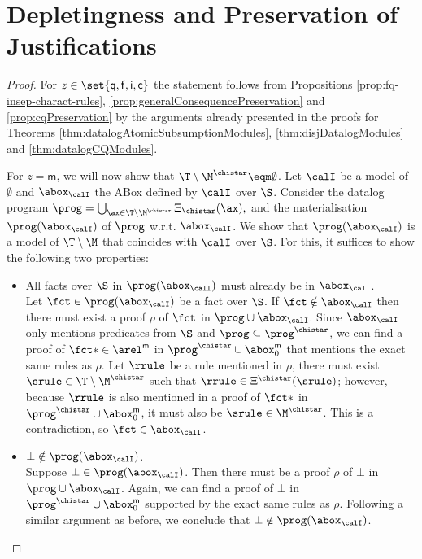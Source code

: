 \section{Depletingness and Preservation of Justifications}

\depletingness*
\begin{proof}
For $z\in\set{\mathsf{q},\mathsf{f},\mathsf{i},\mathsf{c}}$
the statement follows from Propositions \ref{prop:fq-insep-charact-rules}, 
\ref{prop:generalConsequencePreservation} and 
\ref{prop:cqPreservation} by the arguments already presented in the proofs for 
Theorems \ref{thm:datalogAtomicSubsumptionModules}, 
\ref{thm:disjDatalogModules} and \ref{thm:datalogCQModules}.

For $z=\mathsf{m}$, we will now show that $\T\setminus \M^{\chistar} \eqm \emptyset$.
Let $\calI$ be a model of $\emptyset$ and $\abox_{\calI}$ the ABox defined by $\calI$ over $\S$. 
Consider the datalog program $\prog = \bigcup_{\ax\in\T\setminus\M^{\chistar}}\Xi_{\chistar}(\ax),$
and the materialisation $\prog(\abox_{\calI})$ of $\prog$ w.r.t. $\abox_{\calI}$. 
We show that $\prog(\abox_{\calI})$ is a model of $\T\setminus\M$ that coincides with $\calI$ over $\S$. For this, it 
suffices to show the following two properties:
\begin{itemize}
\item All facts over $\S$ in $\prog(\abox_{\calI})$ must already be in $\abox_{\calI}$.\\
  Let $\fct\in\prog(\abox_{\calI})$ be a fact over $\S$. If
  $\fct\notin\abox_{\calI}$ then there must exist a proof $\rho$ of
  $\fct$ in $\prog\cup\abox_{\calI}$. Since $\abox_{\calI}$ only
  mentions predicates from $\S$ and $\prog\subseteq \prog^{\chistar}$,
  we can find a proof of $\fct*\in\arel^{\mathsf{m}}$ in
  $\prog^{\chistar}\cup\abox_0^{\mathsf{m}}$ that mentions the exact
  same rules as $\rho$.  Let $\rrule$ be a rule mentioned in $\rho$,
  there must exist $\srule\in\T\setminus\M^{\chistar}$ such that
  $\rrule\in\Xi^{\chistar}(\srule)$; however, because $\rrule$ is also
  mentioned in a proof of $\fct*$ in
  $\prog^{\chistar}\cup\abox_0^{\mathsf{m}}$, it must also be
  $\srule\in\M^{\chistar}$.  This is a contradiction, so
  $\fct\in\abox_{\calI}$.

\item $\bot\notin\prog(\abox_{\calI})$.\\
Suppose $\bot\in\prog(\abox_{\calI})$. Then there must be a proof $\rho$ of $\bot$ in 
$\prog\cup\abox_{\calI}$. Again, we can find a proof of $\bot$ in $\prog^{\chistar}\cup\abox_0^{\mathsf{m}}$ 
supported by the exact same rules as $\rho$. Following a similar argument as before, we 
conclude that $\bot\notin\prog(\abox_{\calI})$.\qedhere
\end{itemize}
%
\end{proof}

